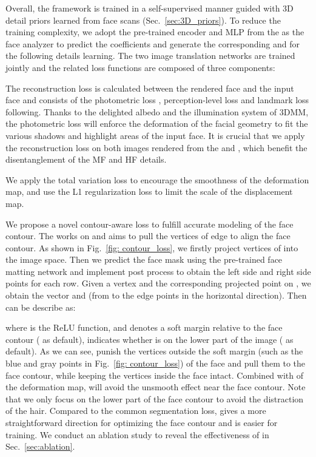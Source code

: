 \documentclass[10pt,twocolumn,letterpaper]{article}
\begin{document}
Overall, the framework is trained in a self-supervised manner guided with 3D detail priors learned from face scans (Sec.~\ref{sec:3D_priors}). To reduce the training complexity, we adopt the pre-trained encoder and MLP from the\cite{deng2019accurate} as the face analyzer to predict the coefficients and generate the corresponding  and  for the following details learning. The two image translation networks are trained jointly and the related loss functions are composed of three components:

 The reconstruction loss is calculated between the rendered face and the input face and consists of the photometric loss  , perception-level loss  and landmark loss  following\cite{deng2019accurate}. Thanks to the delighted albedo and the illumination system of 3DMM, the photometric loss will enforce the deformation of the facial geometry to fit the various shadows and highlight areas of the input face. It is crucial that we apply the reconstruction loss on both images rendered from the  and , which benefit the disentanglement of the MF and HF details.

 We apply the total variation loss \cite{johnson2016perceptual} to encourage the smoothness of the deformation map, and use the L1 regularization loss  to limit the scale of the displacement map.

 We propose a novel contour-aware loss  to fulfill accurate modeling of the face contour. The  works on  and aims to pull the vertices of edge to align the face contour. As shown in Fig.~\ref{fig: contour_loss}, we firstly project vertices of  into the image space. Then we predict the face mask  using the pre-trained face matting network\cite{liu2020boosting} and implement post process to obtain the left side and right side points for each row. Given a vertex  and the corresponding projected point  on , we obtain the vector  and  (from  to the edge points in the horizontal direction). Then  can be describe as:


where  is the ReLU function, and  denotes a soft margin relative to the face contour ( as default),  indicates whether  is on the lower part of the image ( as default). As we can see,  punish the vertices outside the soft margin (such as the blue and gray points in Fig.~\ref{fig: contour_loss}) of the face and pull them to the face contour, while keeping the vertices inside the face intact. Combined with  of the deformation map,  will avoid the unsmooth effect near the face contour. Note that we only focus on the lower part of the face contour to avoid the distraction of the hair.
Compared to the common segmentation loss,  gives a more straightforward direction for optimizing the face contour and is easier for training. We conduct an ablation study to reveal the effectiveness of  in Sec.~\ref{sec:ablation}.
\end{document}
